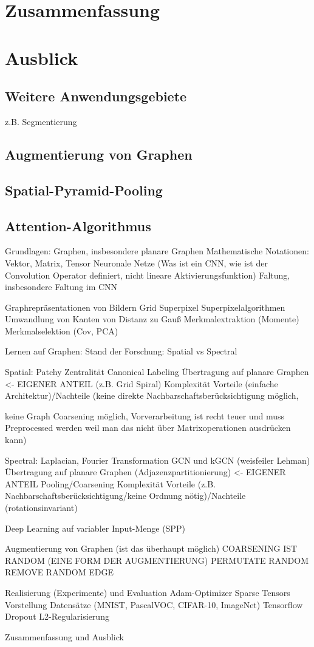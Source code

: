 \chapter{Zusammenfassung}

\chapter{Ausblick}
\section{Weitere Anwendungsgebiete}
z.B. Segmentierung
\section{Augmentierung von Graphen}
\section{Spatial-Pyramid-Pooling}
\section{Attention-Algorithmus}

Grundlagen:
Graphen, insbesondere planare Graphen
Mathematische Notationen: Vektor, Matrix, Tensor
Neuronale Netze (Was ist ein CNN, wie ist der Convolution Operator definiert, nicht lineare Aktivierungsfunktion)
Faltung, insbesondere Faltung im CNN

Graphrepräsentationen von Bildern
Grid
Superpixel
Superpixelalgorithmen
Umwandlung von Kanten von Distanz zu Gauß
Merkmalextraktion (Momente)
Merkmalselektion (Cov, PCA)

Lernen auf Graphen:
Stand der Forschung: Spatial vs Spectral

Spatial:
Patchy
Zentralität
Canonical Labeling
Übertragung auf planare Graphen <- EIGENER ANTEIL (z.B. Grid Spiral)
Komplexität
Vorteile (einfache Architektur)/Nachteile (keine direkte Nachbarschaftsberücksichtigung möglich,

keine Graph Coarsening möglich, Vorverarbeitung ist recht teuer und muss Preprocessed werden weil man das nicht über Matrixoperationen ausdrücken kann)

Spectral:
Laplacian, Fourier Transformation
GCN und kGCN (weisfeiler Lehman)
Übertragung auf planare Graphen (Adjazenzpartitionierung) <- EIGENER ANTEIL
Pooling/Coarsening
Komplexität
Vorteile (z.B. Nachbarschaftsberücksichtigung/keine Ordnung nötig)/Nachteile (rotationsinvariant)

Deep Learning auf variabler Input-Menge (SPP)

Augmentierung von Graphen (ist das überhaupt möglich)
COARSENING IST RANDOM (EINE FORM DER AUGMENTIERUNG)
PERMUTATE RANDOM
REMOVE RANDOM EDGE

Realisierung (Experimente) und Evaluation
Adam-Optimizer
Sparse Tensors
Vorstellung Datensätze (MNIST, PascalVOC, CIFAR-10, ImageNet)
Tensorflow
Dropout L2-Regularisierung

Zusammenfassung und Ausblick
